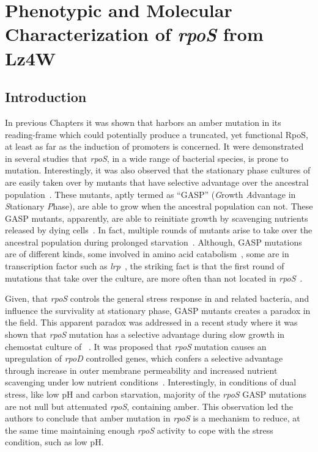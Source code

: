\chapter{Phenotypic and Molecular Characterization of \emph{rpoS} from  Lz4W}

\section{Introduction}
\label{chap6:intro} In previous Chapters it was shown that
\lzsig{} harbors an amber mutation in its reading-frame which
could potentially produce a truncated, yet functional RpoS, at
least as far as the induction of  promoters is concerned.
It were demonstrated in several studies that \emph{rpoS}, in a
wide range of bacterial species, is prone to mutation.
Interestingly, it was also observed that the stationary phase
cultures of  are easily taken over by mutants that have
selective advantage over the ancestral
population~\citep{Zambrano1993}. These mutants, aptly termed as
``GASP'' (\emph{G}rowth \emph{A}dvantage in \emph{S}tationary
\emph{P}hase), are able to grow when the ancestral population can
not. These GASP mutants, apparently, are able to reinitiate growth
by scavenging nutrients released by dying
cells~\citep{Zinser1999}. In fact, multiple rounds of mutants
arise to take over the ancestral population during prolonged
starvation~\citep{Finkel1999}. Although, GASP mutations are of
different kinds, some involved in amino acid
catabolism~\citep{Zinser1999}, some are in transcription factor
such as \emph{lrp}~\citep{Zinser2000}, the striking fact is that
the first round of mutations that take over the culture, are more
often than not located in \emph{rpoS}~\citep{Vulic2001}.

Given, that \emph{rpoS} controls the general stress response in
 and related bacteria, and influence the survivality at
stationary phase, GASP mutants creates a paradox in the field.
This apparent paradox was addressed in a recent study where it was
shown that \emph{rpoS} mutation has a selective advantage during
slow growth in chemostat culture of ~\citep{Mcrobb2002}.
It was proposed that \emph{rpoS} mutation causes an upregulation
of \emph{rpoD} controlled genes, which confers a selective
advantage through increase in outer membrane permeability and
increased nutrient scavenging under low nutrient
conditions~\citep{Mcrobb2002}. Interestingly, in conditions of
dual stress, like low pH and carbon starvation, majority of the
\emph{rpoS} GASP mutations are not null but attenuated
\emph{rpoS}, containing amber. This observation led the authors to
conclude that amber mutation in \emph{rpoS} is a mechanism to
reduce, at the same time maintaining enough \emph{rpoS} activity
to cope with the stress condition, such as low pH.


